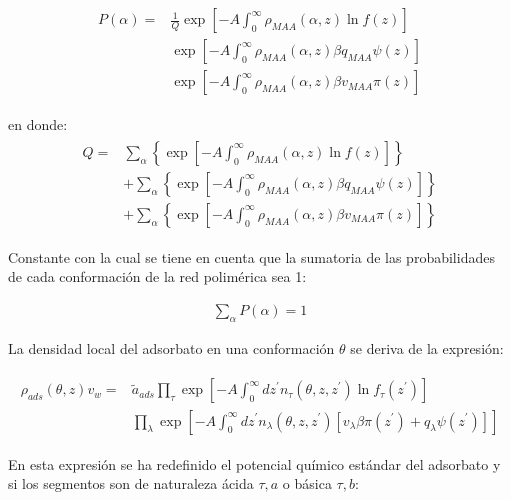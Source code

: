 \begin{align}
	\begin{aligned}
	P(\alpha) = &\frac{1}{Q}\exp\left[ -A \int^\infty_0 \rho_{MAA}(\alpha, z) \ln f(z)\right] \\
	&\exp\left[ -A \int^\infty_0 \rho_{MAA}(\alpha, z) \beta q_{MAA} \psi(z)\right] \\
	& \exp\left[ -A \int^\infty_0 \rho_{MAA}(\alpha, z) \beta v_{MAA} \pi(z)\right] 
	\end{aligned}
	\label{eq:film:probabilidad}
\end{align}

\noindent en donde:
\begin{align}
	\begin{aligned}
		Q = &\sum_\alpha \left\{ \exp\left[ -A \int^\infty_0 \rho_{MAA}(\alpha, z) \ln f(z)\right]\right\} \\
		& + \sum_\alpha\left\{ \exp\left[ -A \int^\infty_0 \rho_{MAA}(\alpha, z) \beta q_{MAA} \psi(z)\right]  \right\} \\
		& + \sum_\alpha\left\{ \exp\left[ -A \int^\infty_0 \rho_{MAA}(\alpha, z) \beta v_{MAA} \pi(z)\right]  \right\} 
	\end{aligned}
\end{align}

Constante con la cual se tiene en cuenta que la sumatoria de las probabilidades de cada conformaci\'on de la red polim\'erica sea 1:

\begin{align}
	\sum_\alpha P(\alpha) = 1                 
\end{align}

La densidad local del adsorbato en una conformaci\'on $\theta$ se deriva de la expresi\'on:

\begin{align}
	\begin{aligned}
	\rho_{ads}(\theta, z)v_w = &\tilde{a}_{ads} \prod_\tau\exp\left[-A\int_0^\infty dz^\prime n_\tau(\theta,z,z^\prime) \ln f_\tau(z^\prime)\right] \\
	& \prod_\lambda \exp \left[-A\int^\infty_0 dz^\prime n_\lambda(\theta,z, z^\prime)[v_\lambda\beta\pi(z^\prime) + q_\lambda \psi(z^\prime)] \right]
	\end{aligned}
\label{eq:film:proteina}
\end{align}

En esta expresi\'on se ha redefinido el potencial qu\'imico est\'andar del adsorbato y si los segmentos son de naturaleza \'acida $\tau, a$ o b\'asica $\tau,b$:


